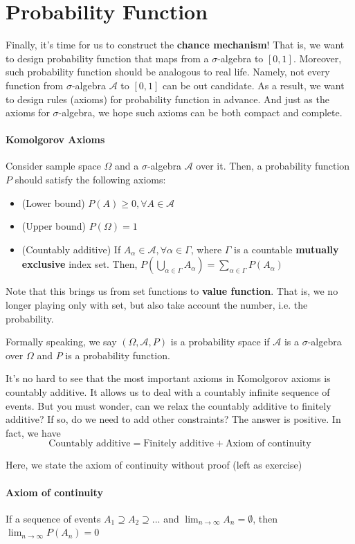 \documentclass[11pt]{report}
\begin{document}
\section{Probability Function}
Finally, it's time for us to construct the {\bf chance mechanism}! That is, we want to design probability function that maps from a $\sigma$-algebra to $[0,1]$. Moreover, such probability function should be analogous to real life. Namely, not every function from $\sigma$-algebra $\mathcal{A}$ to $[0,1]$ can be out candidate. As a result, we want to design rules (axioms) for probability function in advance. And just as the axioms for $\sigma$-algebra, we hope such axioms can be both compact and complete.

\paragraph{Komolgorov Axioms}
Consider sample space $\Omega$ and a $\sigma$-algebra $\mathcal{A}$ over it. Then, a probability function $P$ should satisfy the following axioms:
\begin{itemize}
	\item (Lower bound) $P(A)\geq0, \forall A\in\mathcal{A}$
	\item (Upper bound) $P(\Omega)=1$
	\item (Countably additive) If $A_{\alpha}\in\mathcal{A},\forall \alpha\in\Gamma$, where $\Gamma$ is a countable {\bf mutually exclusive} index set. Then, $P(\bigcup_{\alpha\in\Gamma}A_{\alpha})=\sum_{\alpha\in\Gamma}P(A_{\alpha})$
\end{itemize}
Note that this brings us from set functions to {\bf value function}. That is, we no longer playing only with set, but also take account the number, i.e. the probability.

Formally speaking, we say $(\Omega,\mathcal{A},P)$ is a probability space if $\mathcal{A}$ is a $\sigma$-algebra over $\Omega$ and $P$ is a probability function.

It's no hard to see that the most important axioms in Komolgorov axioms is countably additive. It allows us to deal with a countably infinite sequence of events. But you must wonder, can we relax the countably additive to finitely additive? If so, do we need to add other constraints? The answer is positive. In fact, we have
$$\mbox{Countably additive} = \mbox{Finitely additive} + \mbox{Axiom of continuity}$$

Here, we state the axiom of continuity without proof (left as exercise)
\paragraph{Axiom of continuity}
If a sequence of events $A_1\supseteq A_2\supseteq...$ and $\lim_{n\rightarrow\infty}A_n=\emptyset$, then $\lim_{n\rightarrow\infty}P(A_n)=0$
\end{document}
